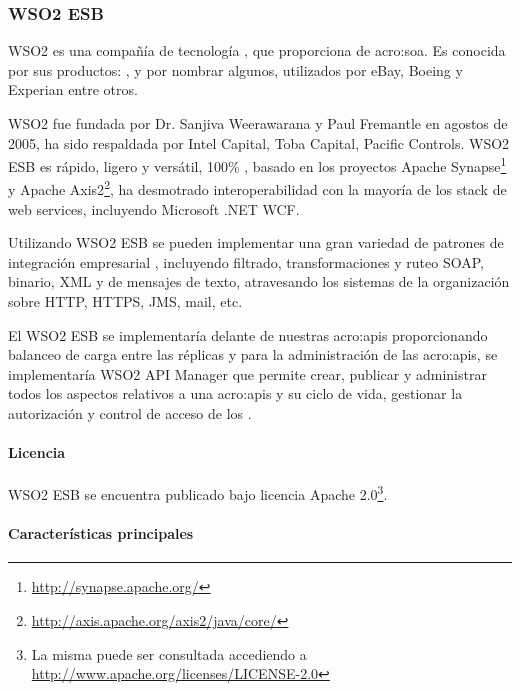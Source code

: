 \subsubsection{WSO2 ESB}
\label{soa:tecnologias:wso2-esb}

WSO2 es una compañía de tecnología , que proporciona  de \gls{acro:soa}.  Es conocida por sus productos: ,  y  por nombrar algunos, utilizados por eBay, Boeing y Experian entre otros.

WSO2 fue fundada por Dr. Sanjiva Weerawarana y Paul Fremantle en agostos de 2005, ha sido respaldada por Intel Capital, Toba Capital, Pacific Controls.  WSO2 ESB es rápido, ligero y versátil, 100\% , basado en los proyectos Apache Synapse\footnote{\url{http://synapse.apache.org/}} y Apache Axis2\footnote{\url{http://axis.apache.org/axis2/java/core/}}, ha desmotrado interoperabilidad con la mayoría de los stack de web services, incluyendo Microsoft .NET WCF.

Utilizando WSO2 ESB se pueden implementar una gran variedad de patrones de integración empresarial , incluyendo filtrado, transformaciones y ruteo SOAP, binario, XML y de mensajes de texto, atravesando los sistemas de la organización sobre HTTP, HTTPS, JMS, mail, etc.

El WSO2 ESB se implementaría delante de nuestras \glspl{acro:api} proporcionando balanceo de carga entre las réplicas y para la administración de las \glspl{acro:api}, se implementaría WSO2 API Manager que permite crear, publicar y administrar todos los aspectos relativos a una \glspl{acro:api} y su ciclo de vida, gestionar la autorización y control de acceso de los .

\paragraph{Licencia}

WSO2 ESB se encuentra publicado bajo licencia Apache 2.0\footnote{La misma puede ser consultada accediendo a \url{http://www.apache.org/licenses/LICENSE-2.0}}.

\paragraph{Características principales}

